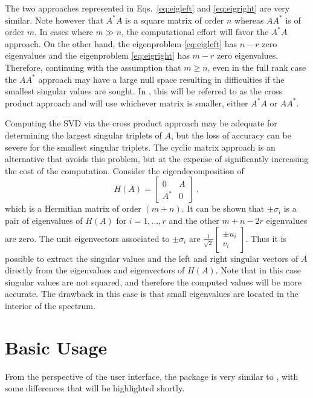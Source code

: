 The two approaches represented in Eqs.\ \ref{eq:eigleft} and \ref{eq:eigright} are very similar. Note however that $A^*A$ is a square matrix of order $n$ whereas $AA^*$ is of order $m$. In cases where $m\gg n$, the computational effort will favor the $A^*A$ approach. On the other hand, the eigenproblem \ref{eq:eigleft} has $n-r$ zero eigenvalues and the eigenproblem \ref{eq:eigright} has $m-r$ zero eigenvalues. Therefore, continuing with the assumption that $m\geq n$, even in the full rank case the $AA^*$ approach may have a large null space resulting in difficulties if the smallest singular values are sought. In \slepc, this will be referred to as the cross product approach and will use whichever matrix is smaller, either $A^*A$ or $AA^*$.

Computing the SVD via the cross product approach may be adequate for determining the largest singular triplets of $A$, but the loss of accuracy can be severe for the smallest singular triplets. The cyclic matrix approach is an alternative that avoids this problem, but at the expense of significantly increasing the cost of the computation. Consider the eigendecomposition of
\begin{equation}
\label{eq:cyclic}
H(A)=\left[\begin{matrix}0&A\\A^*&0\end{matrix}\right]\;,
\end{equation}
which is a Hermitian matrix of order $(m+n)$. It can be shown that $\pm\sigma_i$ is a pair of eigenvalues of $H(A)$ for $i=1,\ldots,r$ and the other $m+n-2r$ eigenvalues are zero. The unit eigenvectors associated to $\pm\sigma_i$ are $\frac{1}{\sqrt{2}}\left[\begin{smallmatrix}\pm u_i\\v_i\end{smallmatrix}\right]$. Thus it is possible to extract the singular values and the left and right singular vectors of $A$ directly from the eigenvalues and eigenvectors of $H(A)$. Note that in this case singular values are not squared, and therefore the computed values will be more accurate. The drawback in this case is that small eigenvalues are located in the interior of the spectrum.

\section{Basic Usage}

From the perspective of the user interface, the  package is very similar to , with some differences that will be highlighted shortly.

